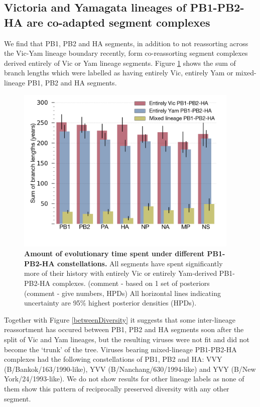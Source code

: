 \documentclass[11pt,oneside,letterpaper]{article}
\begin{document}
\subsection*{Victoria and Yamagata lineages of PB1-PB2-HA are co-adapted segment complexes}
We find that PB1, PB2 and HA segments, in addition to not reassorting across the Vic-Yam lineage boundary recently, form co-reassorting segment complexes derived entirely of Vic or Yam lineage segments.
Figure \ref{stateTime} shows the sum of branch lengths which were labelled as having entirely Vic, entirely Yam or mixed-lineage PB1, PB2 and HA segments.

\begin{figure}[h]
	\centering		
	\includegraphics[width=0.95\textwidth]{figures/InfB_stateTime.png}
	\caption{\textbf{Amount of evolutionary time spent under different PB1-PB2-HA constellations.}
All segments have spent significantly more of their history with entirely Vic or entirely Yam-derived PB1-PB2-HA complexes.
(comment - based on 1 set of posteriors (comment - give numbers, HPDs)
All horizontal lines indicating uncertainty are 95\% highest posterior densities (HPDs).}
	\label{stateTime}
\end{figure}

Together with Figure \ref{betweenDiversity} it suggests that some inter-lineage reassortment has occured between PB1, PB2 and HA segments soon after the split of Vic and Yam lineages, but the resulting viruses were not fit and did not become the `trunk' of the tree.
Viruses bearing mixed-lineage PB1-PB2-HA complexes had the following constellations of PB1, PB2 and HA: VVY (B/Bankok/163/1990-like), YVV (B/Nanchang/630/1994-like) and YVY (B/New York/24/1993-like).
We do not show results for other lineage labels as none of them show this pattern of reciprocally preserved diversity with any other segment.
\end{document}

